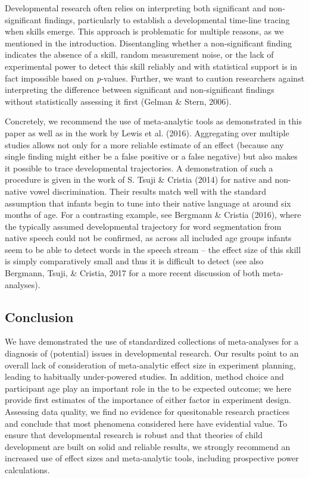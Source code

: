 \documentclass[english,floatsintext,man]{apa6}
\begin{document}
Developmental research often relies on interpreting both significant and
non-significant findings, particularly to establish a developmental
time-line tracing when skills emerge. This approach is problematic for
multiple reasons, as we mentioned in the introduction. Disentangling
whether a non-significant finding indicates the absence of a skill,
random measurement noise, or the lack of experimental power to detect
this skill reliably and with statistical support is in fact impossible
based on \emph{p}-values. Further, we want to caution researchers
against interpreting the difference between significant and
non-significant findings without statistically assessing it first
(Gelman \& Stern, 2006).

Concretely, we recommend the use of meta-analytic tools as demonstrated
in this paper as well as in the work by Lewis et al. (2016). Aggregating
over multiple studies allows not only for a more reliable estimate of an
effect (because any single finding might either be a false positive or a
false negative) but also makes it possible to trace developmental
trajectories. A demonstration of such a procedure is given in the work
of S. Tsuji \& Cristia (2014) for native and non-native vowel
discrimination. Their results match well with the standard assumption
that infants begin to tune into their native language at around six
months of age. For a contrasting example, see Bergmann \& Cristia
(2016), where the typically assumed developmental trajectory for word
segmentation from native speech could not be confirmed, as across all
included age groups infants seem to be able to detect words in the
speech stream -- the effect size of this skill is simply comparatively
small and thus it is difficult to detect (see also Bergmann, Tsuji, \&
Cristia, 2017 for a more recent discussion of both meta-analyses).

\subsection{Conclusion}\label{conclusion}

We have demonstrated the use of standardized collections of
meta-analyses for a diagnosis of (potential) issues in developmental
research. Our results point to an overall lack of consideration of
meta-analytic effect size in experiment planning, leading to habitually
under-powered studies. In addition, method choice and participant age
play an important role in the to be expected outcome; we here provide
first estimates of the importance of either factor in experiment design.
Assessing data quality, we find no evidence for quesitonable research
practices and conclude that most phenomena considered here have
evidential value. To ensure that developmental research is robust and
that theories of child development are built on solid and reliable
results, we strongly recommend an increased use of effect sizes and
meta-analytic tools, including prospective power calculations.
\end{document}
